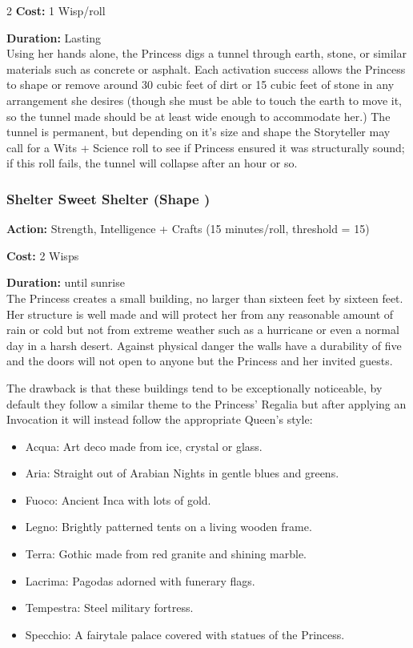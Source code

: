 \begin{multicols}{2}
\noindent \textbf{Cost:} 1 Wisp/roll

\noindent \textbf{Duration:} Lasting \\

\noindent Using her hands alone, the Princess digs a tunnel through earth, stone, or similar materials such as concrete or asphalt. Each activation success allows the Princess to shape or remove around 30 cubic feet of dirt or 15 cubic feet of stone in any arrangement she desires (though she must be able to touch the earth to move it, so the tunnel made should be at least wide enough to accommodate her.) The tunnel is permanent, but depending on it's size and shape the Storyteller may call for a Wits + Science roll to see if Princess ensured it was structurally sound; if this roll fails, the tunnel will collapse after an hour or so.

\subsubsection*{Shelter Sweet Shelter (Shape \textbullet\textbullet\textbullet\textbullet)}
\noindent \textbf{Action:} Strength, Intelligence + Crafts (15 minutes/roll, threshold = 15)

\noindent \textbf{Cost:} 2 Wisps

\noindent \textbf{Duration:} until sunrise\\

The Princess creates a small building, no larger than sixteen feet by sixteen feet. Her structure is well made and will protect her from any reasonable amount of rain or cold but not from extreme weather such as a hurricane or even a normal day in a harsh desert. Against physical danger the walls have a durability of five and the doors will not open to anyone but the Princess and her invited guests.

The drawback is that these buildings tend to be exceptionally noticeable, by default they follow a similar theme to the Princess' Regalia but after applying an Invocation it will instead follow the appropriate Queen's style:

\begin{itemize}
 \item Acqua: Art deco made from ice, crystal or glass.
 \item Aria: Straight out of Arabian Nights in gentle blues and greens.
 \item Fuoco: Ancient Inca with lots of gold.
 \item Legno: Brightly patterned tents on a living wooden frame.
 \item Terra: Gothic made from red granite and shining marble.
 \item Lacrima: Pagodas adorned with funerary flags.
 \item Tempestra: Steel military fortress.
 \item Specchio: A fairytale palace covered with statues of the Princess.\end{itemize}


\end{multicols}
